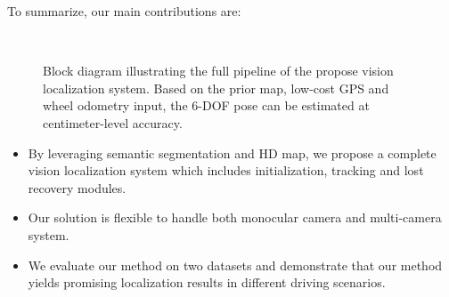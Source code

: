 \documentclass[letterpaper, 10 pt, conference]{ieeeconf}
\newcommand{\hlr}[1]{{\color{red}{#1}}}
\begin{document}
To summarize, our main contributions are:

\begin{figure*}[htb]
  \\
  \caption{Block diagram illustrating the full pipeline of the propose vision localization system. Based on the prior map, low-cost GPS and wheel odometry input, the 6-DOF pose can be estimated at centimeter-level accuracy.} \label{figure:pipeline}
\end{figure*}

\begin{itemize}

\item By leveraging semantic segmentation and HD map, we propose a complete vision localization system which includes initialization, tracking and lost recovery modules.

\item Our solution is flexible to handle both monocular camera and multi-camera system.

\item We evaluate our method on two datasets and demonstrate that our method yields promising localization results in different driving scenarios. 



\end{itemize}

\end{document}
